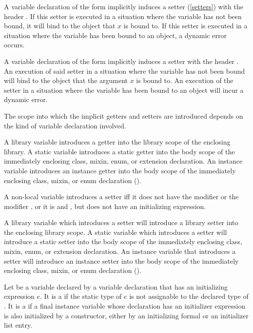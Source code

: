 \documentclass[makeidx]{article}
\begin{document}
\LMHash{}%
A variable declaration of the form
implicitly induces a setter (\ref{setters}) with the header
.
If this setter is executed
in a situation where the variable \id{} has not been bound,
it will bind \id{} to the object that $x$ is bound to.
If this setter is executed
in a situation where the variable \id{} has been bound to an object,
a dynamic error occurs.
\EndCase

\LMHash{}%
A variable declaration of the form
implicitly induces a setter with the header
.
An execution of said setter
in a situation where the variable \id{} has not been bound
will bind \id{} to the object that the argument $x$ is bound to.
An execution of the setter
in a situation where the variable \id{} has been bound to an object
will incur a dynamic error.
\EndCase

\LMHash{}%
The scope into which the implicit getters and setters are introduced
depends on the kind of variable declaration involved.

\LMHash{}%
A library variable introduces a getter into
the library scope of the enclosing library.
A static variable introduces a static getter into
the body scope of the immediately enclosing
class, mixin, enum, or extension declaration.
An instance variable introduces an instance getter into
the body scope of the immediately enclosing
class, mixin, or enum declaration
().

\LMHash{}%
A non-local variable introduces a setter if{}f
it does not have the modifier \FINAL{} or the modifier \CONST{},
or it is \LATE{} and \FINAL, but does not have an initializing expression.

\LMHash{}%
A library variable which introduces a setter will introduce
a library setter into the enclosing library scope.
A static variable which introduces a setter will introduce
a static setter into the body scope of the immediately enclosing
class, mixin, enum, or extension declaration.
An instance variable that introduces a setter will introduce
an instance setter into the body scope of the immediately enclosing
class, mixin, or enum declaration
().

\LMHash{}%
Let \id{} be a variable declared by a variable declaration
that has an initializing expression $e$.
It is a  if the static type of $e$
is not assignable to the declared type of \id.
It is a  if a final instance variable
whose declaration has an initializer expression
is also initialized by a constructor,
either by an initializing formal or an initializer list entry.
\end{document}
